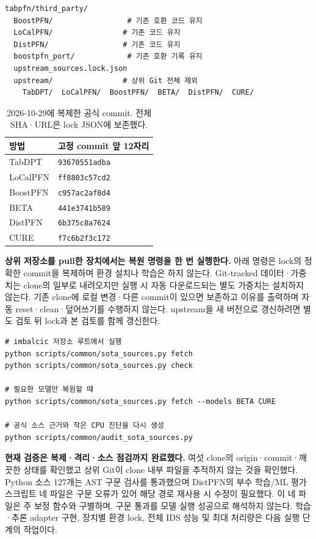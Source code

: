 \begin{Verbatim}[fontsize=\small,breaklines=true]
tabpfn/third_party/
  BoostPFN/                 # 기존 호환 코드 유지
  LoCalPFN/                # 기존 코드 유지
  DistPFN/                 # 기존 코드 유지
  boostpfn_port/            # 기존 호환 기록 유지
  upstream_sources.lock.json
  upstream/                # 상위 Git 전체 제외
    TabDPT/  LoCalPFN/  BoostPFN/  BETA/  DistPFN/  CURE/
\end{Verbatim}

\begin{table}[H]\centering\small
\caption{2026-10-29에 복제한 공식 commit. 전체 SHA·URL은 lock JSON에 보존했다.}
\begin{tabular}{ll}\toprule
방법 & 고정 commit 앞 12자리\\\midrule
TabDPT & \texttt{93670551adba}\\
LoCalPFN & \texttt{ff8803c57cd2}\\
BoostPFN & \texttt{c957ac2af8d4}\\
BETA & \texttt{441e3741b589}\\
DistPFN & \texttt{6b375c8a7624}\\
CURE & \texttt{f7c6b2f3c172}\\\bottomrule
\end{tabular}
\end{table}

\textbf{상위 저장소를 pull한 장치에서는 복원 명령을 한 번 실행한다.} 아래 명령은 lock의 정확한 commit을 복제하며 환경 설치나 학습은 하지 않는다. Git-tracked 데이터·가중치는 clone의 일부로 내려오지만 실행 시 자동 다운로드되는 별도 가중치는 설치하지 않는다. 기존 clone에 로컬 변경·다른 commit이 있으면 보존하고 이유를 출력하며 자동 reset·clean·덮어쓰기를 수행하지 않는다. upstream을 새 버전으로 갱신하려면 별도 검토 뒤 lock과 본 검토를 함께 갱신한다.

\begin{Verbatim}[fontsize=\small,breaklines=true]
# imbalcic 저장소 루트에서 실행
python scripts/common/sota_sources.py fetch
python scripts/common/sota_sources.py check

# 필요한 모델만 복원할 때
python scripts/common/sota_sources.py fetch --models BETA CURE

# 공식 소스 근거와 작은 CPU 진단을 다시 생성
python scripts/common/audit_sota_sources.py
\end{Verbatim}

\textbf{현재 검증은 복제·격리·소스 점검까지 완료했다.} 여섯 clone의 origin·commit·깨끗한 상태를 확인했고 상위 Git이 clone 내부 파일을 추적하지 않는 것을 확인했다. Python 소스 127개는 AST 구문 검사를 통과했으며 DistPFN의 부수 학습/ML 평가 스크립트 네 파일은 구문 오류가 있어 해당 경로 재사용 시 수정이 필요했다. 이 네 파일은 주 보정 함수와 구별하며, 구문 통과를 모델 실행 성공으로 해석하지 않는다. 학습·추론 adapter 구현, 장치별 환경 lock, 전체 IDS 성능 및 최대 처리량은 다음 실행 단계의 작업이다.

